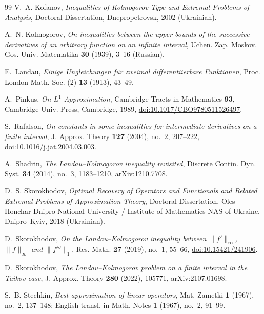 \documentclass[11pt,a4paper]{article}
\theoremstyle{remark}
\numberwithin{equation}{section}
\begin{document}
\begin{thebibliography}{99}
V.~A. Kofanov,
\emph{Inequalities of Kolmogorov Type and Extremal Problems of Analysis},
Doctoral Dissertation, Dnepropetrovsk, 2002 (Ukrainian).

A.~N. Kolmogorov,
\emph{On inequalities between the upper bounds of the successive derivatives of an arbitrary function on an infinite interval},
Uchen. Zap. Moskov. Gos. Univ. Matematika \textbf{30} (1939), 3--16 (Russian).

E.~Landau,
\emph{Einige Ungleichungen f\"ur zweimal differentiierbare Funktionen},
Proc. London Math. Soc. (2) \textbf{13} (1913), 43--49.

A.~Pinkus,
\emph{On $L^1$-Approximation},
Cambridge Tracts in Mathematics \textbf{93}, Cambridge Univ. Press, Cambridge, 1989, \href{https://doi.org/10.1017/CBO9780511526497}{doi:10.1017/CBO9780511526497}.

S.~Rafalson,
\emph{On constants in some inequalities for intermediate derivatives on a finite interval},
J. Approx. Theory \textbf{127} (2004), no.~2, 207--222, \href{https://doi.org/10.1016/j.jat.2004.03.003}{doi:10.1016/j.jat.2004.03.003}.

A.~Shadrin,
\emph{The Landau--Kolmogorov inequality revisited},
Discrete Contin. Dyn. Syst. \textbf{34} (2014), no.~3, 1183--1210, arXiv:1210.7708.

D.~S. Skorokhodov,
\emph{Optimal Recovery of Operators and Functionals and Related Extremal Problems of Approximation Theory},
Doctoral Dissertation, Oles Honchar Dnipro National University / Institute of Mathematics NAS of Ukraine, Dnipro--Kyiv, 2018 (Ukrainian).

D.~Skorokhodov,
\emph{On the Landau--Kolmogorov inequality between $\|f'\|_\infty$, $\|f\|_\infty$ and $\|f'''\|_1$},
Res. Math. \textbf{27} (2019), no.~1, 55--66, \href{https://doi.org/10.15421/241906}{doi:10.15421/241906}.

D.~Skorokhodov,
\emph{The Landau--Kolmogorov problem on a finite interval in the Taikov case},
J. Approx. Theory \textbf{280} (2022), 105771, arXiv:2107.01698.

S.~B. Stechkin,
\emph{Best approximation of linear operators},
Mat. Zametki \textbf{1} (1967), no.~2, 137--148; English transl. in Math. Notes \textbf{1} (1967), no.~2, 91--99.

\end{thebibliography}
\end{document}
